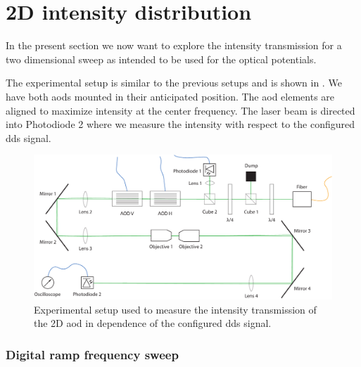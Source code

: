 \section{2D intensity distribution}

In the present section we now want to explore the intensity transmission for
a two dimensional sweep as intended to be used for the optical potentials.

The experimental setup is similar to the previous setups and is shown in
. We have both \gls{aod}s mounted in
their anticipated position. The \gls{aod} elements are aligned to maximize
intensity at the center frequency. The laser beam is directed into
Photodiode \num{2} where we measure the intensity with respect to the
configured \gls{dds} signal.
\begin{figure}[htb]
  \centering
  \includegraphics[width=\textwidth]{../media/setup/intensity-distribution.pdf}
  \caption{Experimental setup used to measure the intensity transmission of
    the 2D \gls{aod} in dependence of the configured \gls{dds} signal.
  }\label{fig:intensity_distribution_setup}
\end{figure}

\subsubsection{Digital ramp frequency sweep}

